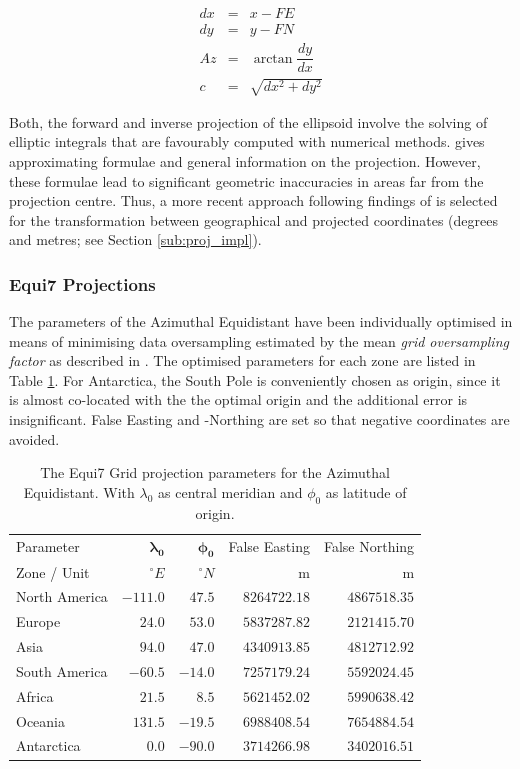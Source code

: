 \documentclass[10pt,a4paper]{article}
\begin{document}
\begin{eqnarray}
dx &=& x - FE \\
dy &=& y - FN \\
\mathit{Az} &=& \arctan \dfrac{dy}{dx} \\
c &=& \sqrt{dx^2 + dy^2}
\end{eqnarray}

Both, the forward and inverse projection of the ellipsoid involve the solving of elliptic integrals that are favourably computed with numerical methods. \cite{Snyder1987} gives approximating formulae and general information on the projection. However, these formulae lead to significant geometric inaccuracies in areas far from the projection centre. Thus, a more recent approach following findings of \citep{Karney2011, Karney2013} is selected for the transformation between geographical and projected coordinates (degrees and metres; see Section \ref{sub:proj_impl}).

\subsubsection{Equi7 Projections}

The parameters of the Azimuthal Equidistant have been individually optimised in means of minimising data oversampling estimated by the mean \textit{grid oversampling factor} as described in \cite{Bauer-Marschallinger2014}. The optimised parameters for each zone are listed in Table \ref{tab:projections}. For Antarctica, the South Pole is conveniently chosen as origin, since it is almost co-located with the the optimal origin and the additional error is insignificant. False Easting and -Northing are set so that negative coordinates are avoided. 

\begin{table}[hbtp]
\caption[Projection Parameter]{
The Equi7 Grid projection parameters for the Azimuthal Equidistant. With $\lambda_{0}$ as central meridian and $\phi_{0}$ as latitude of origin.
}
\centering
	{
	\begin{tabular}{lrrrr}
	\hline
	Parameter & $\mathbf{\lambda_{0}}$ & $\mathbf{\phi_{0}}$ & False Easting & False Northing \\
	Zone / Unit & $^{\circ}E$ & $^{\circ}N$ & m & m \\
	\hline
	North America & $-111.0$ & $47.5$ & $8264722.18$ & $4867518.35$ \\
	Europe & $24.0$ & $53.0$ & $5837287.82$ & $2121415.70$ \\
	Asia & $94.0$ & $47.0$ & $4340913.85$ & $4812712.92$ \\
	South America & $-60.5$ & $-14.0$ & $7257179.24$ & $5592024.45$ \\
	Africa & $21.5$ & $8.5$ & $5621452.02$ & $5990638.42$ \\
	Oceania & $131.5$ & $-19.5$ & $6988408.54$ & $7654884.54$ \\
	Antarctica & $0.0$ & $-90.0$ & $3714266.98$ & $3402016.51$ \\
	\hline
	\end{tabular} 
	}
\label{tab:projections}
\end{table}
\end{document}
